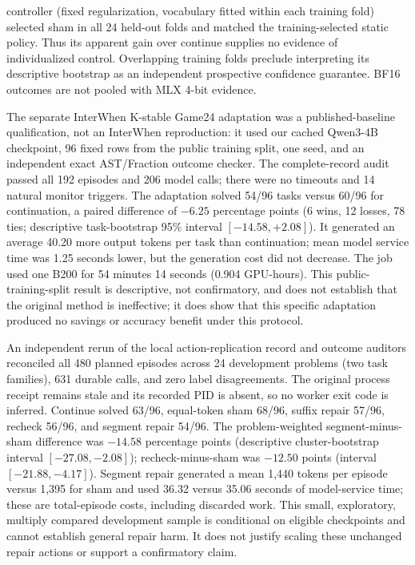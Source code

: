 \documentclass[11pt]{article}
\begin{document}
controller (fixed regularization, vocabulary fitted within each training fold) selected sham in all 24 held-out folds and matched the training-selected static policy. Thus its apparent gain over continue supplies no evidence of individualized control. Overlapping training folds preclude interpreting its descriptive bootstrap as an independent prospective confidence guarantee. BF16 outcomes are not pooled with MLX 4-bit evidence.

The separate InterWhen K-stable Game24 adaptation was a published-baseline qualification, not an InterWhen reproduction: it used our cached Qwen3-4B checkpoint, 96 fixed rows from the public training split, one seed, and an independent exact AST/Fraction outcome checker. The complete-record audit passed all 192 episodes and 206 model calls; there were no timeouts and 14 natural monitor triggers. The adaptation solved 54/96 tasks versus 60/96 for continuation, a paired difference of $-6.25$ percentage points (6 wins, 12 losses, 78 ties; descriptive task-bootstrap 95\% interval $[-14.58,+2.08]$). It generated an average 40.20 more output tokens per task than continuation; mean model service time was 1.25 seconds lower, but the generation cost did not decrease. The job used one B200 for 54 minutes 14 seconds (0.904 GPU-hours). This public-training-split result is descriptive, not confirmatory, and does not establish that the original method is ineffective; it does show that this specific adaptation produced no savings or accuracy benefit under this protocol.

An independent rerun of the local action-replication record and outcome auditors reconciled all 480 planned episodes across 24 development problems (two task families), 631 durable calls, and zero label disagreements. The original process receipt remains stale and its recorded PID is absent, so no worker exit code is inferred. Continue solved 63/96, equal-token sham 68/96, suffix repair 57/96, recheck 56/96, and segment repair 54/96. The problem-weighted segment-minus-sham difference was $-14.58$ percentage points (descriptive cluster-bootstrap interval $[-27.08,-2.08]$); recheck-minus-sham was $-12.50$ points (interval $[-21.88,-4.17]$). Segment repair generated a mean 1,440 tokens per episode versus 1,395 for sham and used 36.32 versus 35.06 seconds of model-service time; these are total-episode costs, including discarded work. This small, exploratory, multiply compared development sample is conditional on eligible checkpoints and cannot establish general repair harm. It does not justify scaling these unchanged repair actions or support a confirmatory claim.
\end{document}
